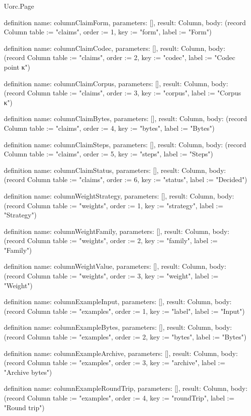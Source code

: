 \begin{lexlean}{Uorc.Page}
\begin{semanticmodule}
definition{
  name: columnClaimForm,
  parameters: [],
  result: Column,
  body: (record Column {table := "claims", order := 1, key := "form", label := "Form"})
}

definition{
  name: columnClaimCodec,
  parameters: [],
  result: Column,
  body: (record Column {table := "claims", order := 2, key := "codec", label := "Codec point κ"})
}

definition{
  name: columnClaimCorpus,
  parameters: [],
  result: Column,
  body: (record Column {table := "claims", order := 3, key := "corpus", label := "Corpus κ"})
}

definition{
  name: columnClaimBytes,
  parameters: [],
  result: Column,
  body: (record Column {table := "claims", order := 4, key := "bytes", label := "Bytes"})
}

definition{
  name: columnClaimSteps,
  parameters: [],
  result: Column,
  body: (record Column {table := "claims", order := 5, key := "steps", label := "Steps"})
}

definition{
  name: columnClaimStatus,
  parameters: [],
  result: Column,
  body: (record Column {table := "claims", order := 6, key := "status", label := "Decided"})
}

definition{
  name: columnWeightStrategy,
  parameters: [],
  result: Column,
  body: (record Column {table := "weights", order := 1, key := "strategy", label := "Strategy"})
}

definition{
  name: columnWeightFamily,
  parameters: [],
  result: Column,
  body: (record Column {table := "weights", order := 2, key := "family", label := "Family"})
}

definition{
  name: columnWeightValue,
  parameters: [],
  result: Column,
  body: (record Column {table := "weights", order := 3, key := "weight", label := "Weight"})
}

definition{
  name: columnExampleInput,
  parameters: [],
  result: Column,
  body: (record Column {table := "examples", order := 1, key := "label", label := "Input"})
}

definition{
  name: columnExampleBytes,
  parameters: [],
  result: Column,
  body: (record Column {table := "examples", order := 2, key := "bytes", label := "Bytes"})
}

definition{
  name: columnExampleArchive,
  parameters: [],
  result: Column,
  body: (record Column {table := "examples", order := 3, key := "archive", label := "Archive bytes"})
}

definition{
  name: columnExampleRoundTrip,
  parameters: [],
  result: Column,
  body: (record Column {table := "examples", order := 4, key := "roundTrip", label := "Round trip"})
}


\end{semanticmodule}
\end{lexlean}

